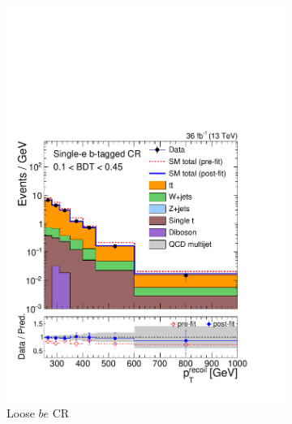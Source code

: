 \begin{figure}[]
\begin{center}
\begin{subfigure}[t]{0.24\textwidth}
            \includegraphics[width=\textwidth]{figures/monotop/postfit/stackedPostfit_singleelectrontop_monotop_loose.pdf}
            \caption{Loose $be$ CR}
        \end{subfigure}
        \begin{subfigure}[t]{0.24\textwidth}

\end{subfigure}
\end{center}
\end{figure}
